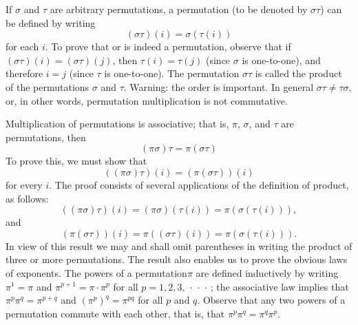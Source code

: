 If \(\sigma\) and \(\tau\) are arbitrary permutations, a permutation (to be
denoted by \(\sigma\tau\)) can be defined by writing 
\begin{equation*}
    (\sigma\tau)(i) = \sigma(\tau(i))
\end{equation*}
for each \(i\). To prove that or is indeed a permutation, observe that if
\((\sigma\tau)(i) = (\sigma\tau)(j)\), then \(\tau(i) = \tau(j)\) (since
\(\sigma\) is one-to-one), and therefore \(i = j\) (since \(\tau\) is
one-to-one). The permutation \(\sigma\tau\) is called the product of the
permutations \(\sigma\) and \(\tau\). Warning: the order is important. In
general \(\sigma\tau \neq \tau\sigma\), or, in other words, permutation
multiplication is not commutative.

Multiplication of permutations is associative; that is, \(\pi\), \(\sigma\), and
\(\tau\) are permutations, then
\begin{equation}
    (\pi\sigma)\tau = \pi(\sigma\tau)
\end{equation}
To prove this, we must show that
\begin{equation*}
    ((\pi\sigma)\tau)(i) =( \pi(\sigma\tau))(i)
\end{equation*}
for every \(i\). The proof consists of several applications of the definition of
product, as follows:
\begin{equation*}
    ((\pi\sigma)\tau)(i) = (\pi\sigma)(\tau(i)) = \pi(\sigma(\tau(i))),
\end{equation*}
and
\begin{equation*}
    (\pi(\sigma\tau))(i) = \pi((\sigma\tau)(i)) = \pi(\sigma(\tau(i))).
\end{equation*}
In view of this result we may and shall omit parentheses in writing the product
of three or more permutations. The result also enables us to prove the obvious
laws of exponents. The powers of a permutation\(\pi\) are defined inductively by
writing \(\pi^1 = \pi\) and \(\pi^{p+1} = \pi\cdot\pi^p\) for all \(p = 1, 2,
3,\,\cdot\,\cdot\,\cdot\,\); the associative law implies that \(\pi^p \pi^q =
\pi^{p+q}\) and \((\pi^p)^q = \pi^{pq}\) for all \(p\) and \(q\). Observe that
any two powers of a permutation commute with each other, that is, that \(\pi^p
\pi^q = \pi^q \pi^p\).

